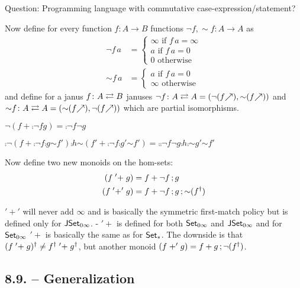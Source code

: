 \documentclass[runningheads,envcountsame]{llncs}
\begin{document}
Question: Programming language with commutative case-expression/statement?

Now define for every function $f\colon A \to B$ functions $\neg f, {\sim}f\colon A \to A$ as
\begin{align}
    \neg f\,a &= \begin{cases}
        \infty \mbox{ if } f\,a = \infty \\
        a \mbox{ if } f\,a = 0 \\
        0 \mbox{ otherwise}
    \end{cases} \\
    {\sim}f\,a &= \begin{cases}
        a \mbox{ if } f\,a = 0 \\
        \infty \mbox{ otherwise}
    \end{cases}
\end{align} 
and define for a janus $f\colon A \mathrel{{\rightleftarrows}} B$ januses $\neg f\colon A \mathrel{\js} A = (\neg(\f{f}), {\sim}(\f{f}))$ and ${\sim}f\colon A \mathrel{\js} A = ({\sim}(\f{f}), \neg(\f{f}))$ which are partial isomorphisms.

\begin{lemma}
    \begin{lemmalist}
        \item $\neg (f + \comp{\neg f}{g}) = \comp{\neg f}{\neg g}$
        \item $\comp{\neg (f + \comp{\neg f}{\comp{g}{{\sim}f'}})}{\comp{h}{{\sim}(f' + \comp{\neg f}{\comp{g'}{{\sim}f'}})}} = \comp{\comp{\neg f}{\neg g}}{\comp{h}{\comp{{\sim}g'}}{{\sim}f'}}$
    \end{lemmalist}
\end{lemma}

Now define two new monoids on the hom-sets:
\begin{align}
    (f \mathrel{'+} g) &= f + \comp{\neg f}{g} \\
    (f \mathrel{'+'} g) &= f + \comp{\neg f}{\comp{g}{{\sim}(\rev{f})}}
\end{align}

$'+'$ will never add $\infty$ and is basically the symmetric first-match policy but is defined only for $\mathsf{J}\mathsf{Set}_{0\infty}$.
-
$'+$ is defined for both $\mathsf{Set}_{0\infty}$ and $\mathsf{J}\mathsf{Set}_{0\infty}$ and for $\mathsf{Set}_{0\infty}$ $'+$ is basically the same as for $\mathsf{Set}_*$. The downside is that $\rev{(f \mathrel{'+} g)} \neq \rev{f} \mathrel{'+} \rev{g}$, but another monoid $(f \mathrel{+'} g) = f + \comp{g}{\neg(\rev{f})}$.

\subsection{8.9. -- Generalization}
\end{document}
